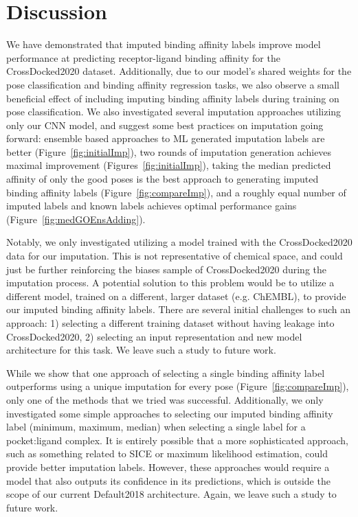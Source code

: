 \documentclass[journal=jmcmar,manuscript=article]{achemso}
\begin{document}
\section{Discussion}
We have demonstrated that imputed binding affinity labels improve model performance at predicting receptor-ligand binding affinity for the CrossDocked2020 dataset.
Additionally, due to our model's shared weights for the pose classification and binding affinity regression tasks, we also observe a small beneficial effect of including imputing binding affinity labels during training on pose classification.
We also investigated several imputation approaches utilizing only our CNN model, and suggest some best practices on imputation going forward: ensemble based approaches to ML generated imputation labels are better (Figure~\ref{fig:initialImp}), two rounds of imputation generation achieves maximal improvement (Figures~\ref{fig:initialImp}), taking the median predicted affinity of only the good poses is the best approach to generating imputed binding affinity labels (Figure~\ref{fig:compareImp}), and a roughly equal number of imputed labels and known labels achieves optimal performance gains (Figure~\ref{fig:medGOEnsAdding}).

Notably, we only investigated utilizing a model trained with the CrossDocked2020 data for our imputation.
This is not representative of chemical space, and could just be further reinforcing the biases sample of CrossDocked2020 during the imputation process.
A potential solution to this problem would be to utilize a different model, trained on a different, larger dataset (e.g. ChEMBL\cite{Chembl}), to provide our imputed binding affinity labels.
There are several initial challenges to such an approach: 1) selecting a different training dataset without having leakage into CrossDocked2020, 2) selecting an input representation and new model architecture for this task.
We leave such a study to future work.

While we show that one approach of selecting a single binding affinity label outperforms using a unique imputation for every pose (Figure~\ref{fig:compareImp}), only one of the methods that we tried was successful.
Additionally, we only investigated some simple approaches to selecting our imputed binding affinity label (minimum, maximum, median) when selecting a single label for a pocket:ligand complex.
It is entirely possible that a more sophisticated approach, such as something related to SICE\cite{SICE} or maximum likelihood estimation, could provide better imputation labels.
However, these approaches would require a model that also outputs its confidence in its predictions, which is outside the scope of our current Default2018 architecture.
Again, we leave such a study to future work.
\end{document}
